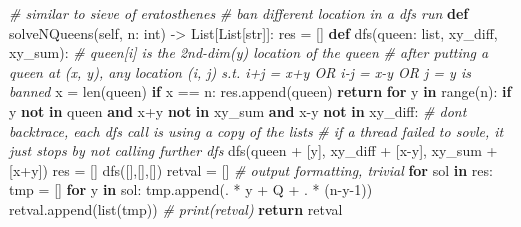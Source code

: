 \documentclass[
]{article}
\newenvironment{Shaded}{}{}
\newcommand{\BuiltInTok}[1]{#1}
\newcommand{\CommentTok}[1]{\textcolor[rgb]{0.38,0.63,0.69}{\textit{#1}}}
\newcommand{\ControlFlowTok}[1]{\textcolor[rgb]{0.00,0.44,0.13}{\textbf{#1}}}
\newcommand{\DecValTok}[1]{\textcolor[rgb]{0.25,0.63,0.44}{#1}}
\newcommand{\KeywordTok}[1]{\textcolor[rgb]{0.00,0.44,0.13}{\textbf{#1}}}
\newcommand{\NormalTok}[1]{#1}
\newcommand{\OperatorTok}[1]{\textcolor[rgb]{0.40,0.40,0.40}{#1}}
\newcommand{\StringTok}[1]{\textcolor[rgb]{0.25,0.44,0.63}{#1}}
\newcommand{\VariableTok}[1]{\textcolor[rgb]{0.10,0.09,0.49}{#1}}
\begin{document}
\begin{Shaded}
\begin{Highlighting}[]
\CommentTok{\# similar to sieve of eratosthenes}
\CommentTok{\# ban different location in a dfs run}
\KeywordTok{def}\NormalTok{ solveNQueens(}\VariableTok{self}\NormalTok{, n: }\BuiltInTok{int}\NormalTok{) }\OperatorTok{{-}\textgreater{}}\NormalTok{ List[List[}\BuiltInTok{str}\NormalTok{]]:}
\NormalTok{        res }\OperatorTok{=}\NormalTok{ []}
        \KeywordTok{def}\NormalTok{ dfs(queen: }\BuiltInTok{list}\NormalTok{, xy\_diff, xy\_sum):}
            \CommentTok{\# queen[i] is the 2nd{-}dim(y) location of the queen}
            \CommentTok{\# after putting a queen at (x, y), any location (i, j) s.t. i+j = x+y OR i{-}j = x{-}y OR j = y is banned}
\NormalTok{            x }\OperatorTok{=} \BuiltInTok{len}\NormalTok{(queen)}
            \ControlFlowTok{if}\NormalTok{ x }\OperatorTok{==}\NormalTok{ n:}
\NormalTok{                res.append(queen)}
                \ControlFlowTok{return}
            \ControlFlowTok{for}\NormalTok{ y }\KeywordTok{in} \BuiltInTok{range}\NormalTok{(n):}
                \ControlFlowTok{if}\NormalTok{ y }\KeywordTok{not} \KeywordTok{in}\NormalTok{ queen }\KeywordTok{and}\NormalTok{ x}\OperatorTok{+}\NormalTok{y }\KeywordTok{not} \KeywordTok{in}\NormalTok{ xy\_sum }\KeywordTok{and}\NormalTok{ x}\OperatorTok{{-}}\NormalTok{y }\KeywordTok{not} \KeywordTok{in}\NormalTok{ xy\_diff:}
                    \CommentTok{\# don\textquotesingle{}t backtrace, each dfs call is using a copy of the lists}
                    \CommentTok{\# if a thread failed to sovle, it just stops by not calling further dfs}
\NormalTok{                    dfs(queen }\OperatorTok{+}\NormalTok{ [y], xy\_diff }\OperatorTok{+}\NormalTok{ [x}\OperatorTok{{-}}\NormalTok{y], xy\_sum }\OperatorTok{+}\NormalTok{ [x}\OperatorTok{+}\NormalTok{y])}
\NormalTok{        res }\OperatorTok{=}\NormalTok{ []}
\NormalTok{        dfs([],[],[])}
\NormalTok{        retval }\OperatorTok{=}\NormalTok{ []}
        \CommentTok{\# output formatting, trivial }
        \ControlFlowTok{for}\NormalTok{ sol }\KeywordTok{in}\NormalTok{ res:}
\NormalTok{            tmp }\OperatorTok{=}\NormalTok{ []}
            \ControlFlowTok{for}\NormalTok{ y }\KeywordTok{in}\NormalTok{ sol:}
\NormalTok{                tmp.append(}\StringTok{\textquotesingle{}.\textquotesingle{}} \OperatorTok{*}\NormalTok{ y }\OperatorTok{+} \StringTok{\textquotesingle{}Q\textquotesingle{}} \OperatorTok{+} \StringTok{\textquotesingle{}.\textquotesingle{}} \OperatorTok{*}\NormalTok{ (n}\OperatorTok{{-}}\NormalTok{y}\OperatorTok{{-}}\DecValTok{1}\NormalTok{))}
\NormalTok{            retval.append(}\BuiltInTok{list}\NormalTok{(tmp))}
        \CommentTok{\# print(retval)}
        \ControlFlowTok{return}\NormalTok{ retval}
\end{Highlighting}
\end{Shaded}
\end{document}
